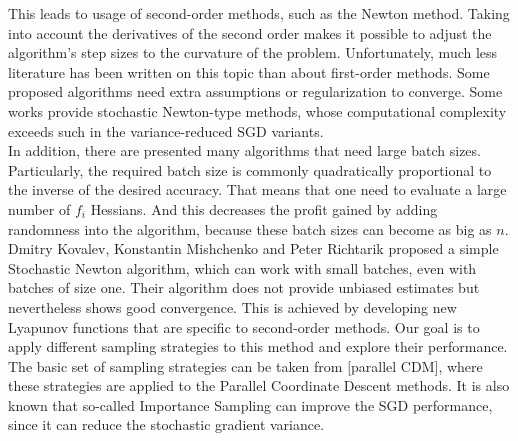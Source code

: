 \documentclass{article}
\begin{document}
	This leads to usage of second-order methods, such as the Newton method. Taking into account the derivatives of the second order makes it possible to adjust the algorithm's step sizes to the curvature of the problem. Unfortunately, much less literature has been written on this topic than about first-order methods. Some proposed algorithms need extra assumptions or regularization to converge. Some works provide stochastic Newton-type methods, whose computational complexity exceeds such in the variance-reduced SGD variants. \\
	
	In addition, there are presented many algorithms that need large batch sizes. Particularly, the required batch size is commonly quadratically proportional to the inverse of the desired accuracy. That means that one need to evaluate a large number of $f_i$ Hessians. And this decreases the profit gained by adding randomness into the algorithm, because these batch sizes can become as big as $n$. \\
	
	Dmitry Kovalev, Konstantin Mishchenko and Peter Richtarik proposed a simple Stochastic Newton algorithm, which can work with small batches, even with batches of size one. Their algorithm does not provide unbiased estimates but nevertheless shows good convergence. This is achieved by developing new Lyapunov functions that are specific to second-order methods. Our goal is to apply different sampling strategies to this method and explore their performance. \\
	
	The basic set of sampling strategies can be taken from [parallel CDM], where these strategies are applied to the Parallel Coordinate Descent methods. It is also known that so-called Importance Sampling can improve the SGD performance, since it can reduce the stochastic gradient variance. \\
	
	
	
\renewcommand\refname{References}	


\end{document}
